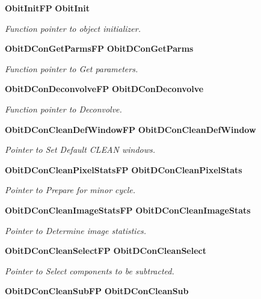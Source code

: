 \begin{CompactItemize}
{\bf Obit\-Init\-FP} {\bf Obit\-Init}
\begin{CompactList}\small\item\em Function pointer to object initializer. \item\end{CompactList}\item 
{\bf Obit\-DCon\-Get\-Parms\-FP} {\bf Obit\-DCon\-Get\-Parms}
\begin{CompactList}\small\item\em Function pointer to Get parameters. \item\end{CompactList}\item 
{\bf Obit\-DCon\-Deconvolve\-FP} {\bf Obit\-DCon\-Deconvolve}
\begin{CompactList}\small\item\em Function pointer to Deconvolve. \item\end{CompactList}\item 
{\bf Obit\-DCon\-Clean\-Def\-Window\-FP} {\bf Obit\-DCon\-Clean\-Def\-Window}
\begin{CompactList}\small\item\em Pointer to Set Default CLEAN windows. \item\end{CompactList}\item 
{\bf Obit\-DCon\-Clean\-Pixel\-Stats\-FP} {\bf Obit\-DCon\-Clean\-Pixel\-Stats}
\begin{CompactList}\small\item\em Pointer to Prepare for minor cycle. \item\end{CompactList}\item 
{\bf Obit\-DCon\-Clean\-Image\-Stats\-FP} {\bf Obit\-DCon\-Clean\-Image\-Stats}
\begin{CompactList}\small\item\em Pointer to Determine image statistics. \item\end{CompactList}\item 
{\bf Obit\-DCon\-Clean\-Select\-FP} {\bf Obit\-DCon\-Clean\-Select}
\begin{CompactList}\small\item\em Pointer to Select components to be subtracted. \item\end{CompactList}\item 
{\bf Obit\-DCon\-Clean\-Sub\-FP} {\bf Obit\-DCon\-Clean\-Sub}

\end{CompactItemize}
